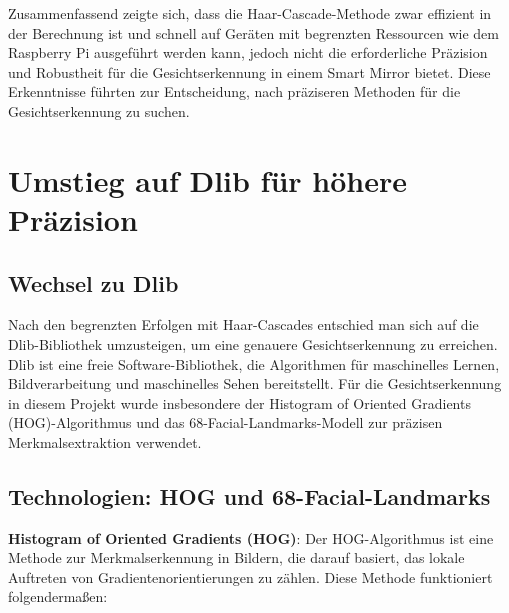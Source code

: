 Zusammenfassend zeigte sich, dass die Haar-Cascade-Methode zwar effizient in der Berechnung ist und schnell auf Geräten mit begrenzten Ressourcen wie dem Raspberry Pi ausgeführt werden kann, jedoch nicht die erforderliche Präzision und Robustheit für die Gesichtserkennung in einem Smart Mirror bietet. Diese Erkenntnisse führten zur Entscheidung, nach präziseren Methoden für die Gesichtserkennung zu suchen.




\section{Umstieg auf Dlib für höhere Präzision}

\subsection{Wechsel zu Dlib}
Nach den begrenzten Erfolgen mit Haar-Cascades entschied man sich auf die Dlib-Bibliothek umzusteigen, um eine genauere Gesichtserkennung zu erreichen. Dlib ist eine freie Software-Bibliothek, die Algorithmen für maschinelles Lernen, Bildverarbeitung und maschinelles Sehen bereitstellt. Für die Gesichtserkennung in diesem Projekt wurde insbesondere der Histogram of Oriented Gradients (HOG)-Algorithmus und das 68-Facial-Landmarks-Modell zur präzisen Merkmalsextraktion verwendet.

\subsection{Technologien: HOG und 68-Facial-Landmarks}
\textbf{Histogram of Oriented Gradients (HOG)}: Der HOG-Algorithmus ist eine Methode zur Merkmalserkennung in Bildern, die darauf basiert, das lokale Auftreten von Gradientenorientierungen zu zählen. Diese Methode funktioniert folgendermaßen:

